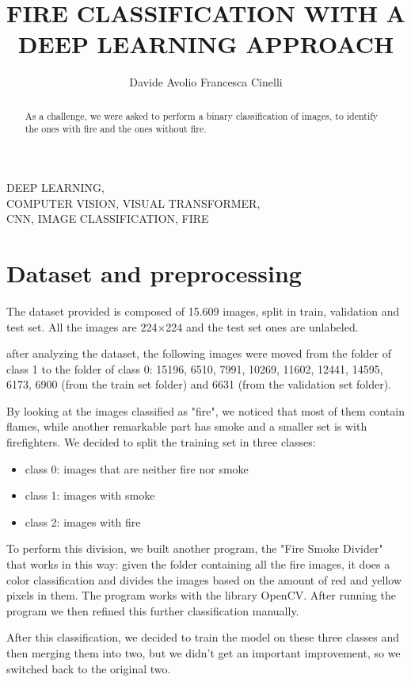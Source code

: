 \documentclass[11pt,journal]{IEEEtran}
\title{FIRE CLASSIFICATION WITH A DEEP LEARNING APPROACH}
\author{Davide Avolio \quad Francesca Cinelli}
\newcommand{\nl}{

\medskip

}
\begin{document}
\maketitle

\begin{abstract}
As a challenge, we were asked to perform a binary classification of images, to identify the ones with fire and the ones without fire.
\end{abstract}

\begin{IEEEkeywords}
    DEEP LEARNING, \\
    COMPUTER VISION, VISUAL TRANSFORMER,\\
    CNN, IMAGE CLASSIFICATION, FIRE
\end{IEEEkeywords}

\section{Dataset and preprocessing}
The dataset provided is composed of 15.609 images, split in train, validation and test set. All the images are 224×224 and the test set ones are unlabeled. \nl
after analyzing the dataset, the following images were moved from the folder of class 1 to the folder of class 0: 15196, 6510, 7991, 10269, 11602, 12441, 14595, 6173, 6900 (from the train set folder) and 6631 (from the validation set folder). \nl
By looking at the images classified as "fire", we noticed that most of them contain flames, while another remarkable part has smoke and a smaller set is with firefighters. We decided to split the training set in three classes:
\begin{itemize}
	\item class 0: images that are neither fire nor smoke
	\item class 1: images with smoke
	\item class 2: images with fire
\end{itemize}
To perform this division, we built another program, the "Fire Smoke Divider"\cite{firesmokedivider} that works in this way: given the folder containing all the fire images, it does a color classification and divides the images based on the amount of red and yellow pixels in them. The program works with the library OpenCV. After running the program we then refined this further classification manually. \nl
After this classification, we decided to train the model on these three classes and then merging them into two, but we didn't get an important improvement, so we switched back to the original two.
\end{document}
